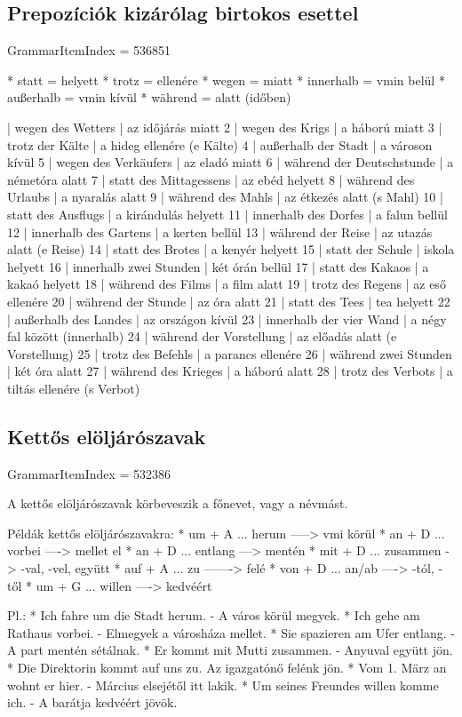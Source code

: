 \documentclass{article}
\newenvironment{desc}{\verbatim}{\endverbatim}
\newenvironment{exmp}{\verbatim}{\endverbatim}
\begin{document}
\subsection{Prepozíciók kizárólag birtokos esettel}

GrammarItemIndex = 536851

\begin{desc}
* statt = helyett
* trotz = ellenére
* wegen = miatt
* innerhalb = vmin belül
* außerhalb = vmin kívül
* während = alatt (időben)
\end{desc}

\begin{exmp}
1 | wegen des Wetters | az időjárás miatt
2 | wegen des Krigs | a háború miatt
3 | trotz der Kälte | a hideg ellenére (e Kälte)
4 | außerhalb der Stadt | a városon kívül
5 | wegen des Verkäufers | az eladó miatt
6 | während der Deutschstunde | a németóra alatt
7 | statt des Mittagessens | az ebéd helyett
8 | während des Urlaubs | a nyaralás alatt
9 | während des Mahls | az étkezés alatt (s Mahl)
10 | statt des Ausflugs | a kirándulás helyett
11 | innerhalb des Dorfes | a falun bellül
12 | innerhalb des Gartens | a kerten bellül
13 | während der Reise | az utazás alatt (e Reise)
14 | statt des Brotes | a kenyér helyett
15 | statt der Schule | iskola helyett
16 | innerhalb zwei Stunden | két órán bellül
17 | statt des Kakaos | a kakaó helyett
18 | während des Films | a film alatt
19 | trotz des Regens | az eső ellenére
20 | während der Stunde | az óra alatt
21 | statt des Tees | tea helyett
22 | außerhalb des Landes | az országon kívül
23 | innerhalb der vier Wand | a négy fal között (innerhalb)
24 | während der Vorstellung | az előadás alatt (e Vorstellung)
25 | trotz des Befehls | a parancs ellenére
26 | während zwei Stunden | két óra alatt
27 | während des Krieges | a háború alatt
28 | trotz des Verbots | a tiltás ellenére (s Verbot)
\end{exmp}

\subsection{Kettős elöljárószavak}

GrammarItemIndex = 532386

\begin{desc}
A kettős elöljárószavak körbeveszik a főnevet, vagy a névmást.

Példák kettős elöljárószavakra:
* um + A ... herum -----> vmi körül
* an + D ... vorbei ----> mellet el
* an + D ... entlang ---> mentén
* mit + D ... zusammen -> -val, -vel, együtt
* auf + A ... zu -------> felé
* von + D ... an/ab ----> -tól, -től
* um + G ... willen ----> kedvéért

Pl.: * Ich fahre um die Stadt herum. - A város körül megyek.
* Ich gehe am Rathaus vorbei. - Elmegyek a városháza mellet.
* Sie spazieren am Ufer entlang. - A part mentén sétálnak.
* Er kommt mit Mutti zusammen. - Anyuval együtt jön.
* Die Direktorin kommt auf uns zu. Az igazgatónő felénk jön.
* Vom 1. März an wohnt er hier. - Március elsejétől itt lakik.
* Um seines Freundes willen komme ich. - A barátja kedvéért jövök.
\end{desc}
\end{document}

